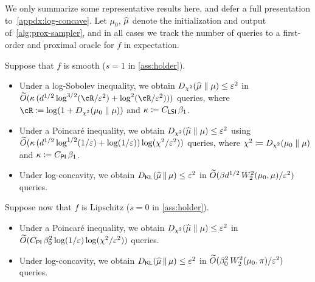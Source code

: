 We only summarize some representative results here, and defer a full presentation to~\cref{appdx:log-concave}.
Let $\mu_0$, $\widehat{\mu}$ denote the initialization and output of~\cref{alg:prox-sampler}, and in all cases we track the number of queries to a first-order and proximal oracle for $f$ in expectation.

Suppose that $f$ is smooth ($s=1$ in \cref{ass:holder}).
\begin{itemize}
    \item Under a log-Sobolev inequality, we obtain $\Dchis{\wh\mu}{\mu} \le \varepsilon^2$ in $\wt O(\kappa \,(d^{1/2} \log^{3/2}(\cR/\varepsilon^2) + \log^2(\cR/\varepsilon^2)))$ queries, where $\cR \deq \log(1+\Dchis{\mu_0}{\mu})$ and $\kappa \coloneqq C_{\mathsf{LSI}}\,\beta_1$. %
    \item Under a Poincar\'e inequality, we obtain $\Dchis{\wh\mu}{\mu} \le \varepsilon^2$ using $\widetilde{O}(\kappa\,( d^{1/2}\log^{1/2}(1/\varepsilon) + \log(1/\varepsilon)) \log(\chi^2/\varepsilon^2))$ queries, where $\chi^2 \deq \Dchis{\mu_0}{\mu}$ and $\kappa \coloneqq C_{\mathsf{PI}}\,\beta_1$.
    \item Under log-concavity, we obtain $\Dkl{\wh\mu}{\mu}\le \varepsilon^2$ in $\widetilde{O}(\beta d^{1/2}\, W_2^2(\mu_0,\mu)/\varepsilon^2)$ queries.
\end{itemize}
Suppose now that $f$ is Lipschitz ($s=0$ in \cref{ass:holder}).
\begin{itemize}
    \item Under a Poincar\'e inequality, we obtain $\Dchis{\wh\mu}{\mu} \le \varepsilon^2$ in $\widetilde{O}(C_{\mathsf{PI}} \,\beta_0^2 \log(1/\varepsilon) \log(\chi^2/\varepsilon^2))$ queries.
    \item Under log-concavity, we obtain $\Dkl{\wh\mu}{\mu}\le \varepsilon^2$ in $\widetilde{O}(\beta_0^2 \,W_2^2(\mu_0,\pi)/\varepsilon^2)$ queries.
\end{itemize}
